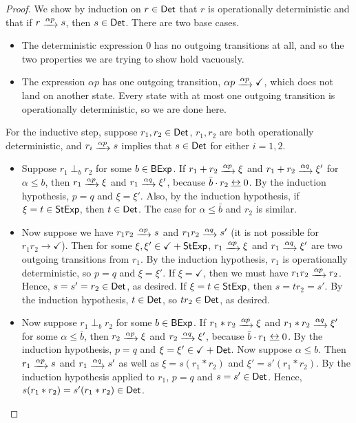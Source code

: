 \documentclass[orivec,envcountsect,envcountsame]{llncs}
\begin{document}
\begin{proof}
	We show by induction on \(r \in \mathsf{Det}\) that \(r\) is operationally deterministic and that if \(r \tr{\alpha p} s\), then \(s \in \mathsf{Det}\).
	There are two base cases.
	\begin{itemize}
		\item The deterministic expression \(0\) has no outgoing transitions at all, and so the two properties we are trying to show hold vacuously.
		\item The expression \(\alpha p\) has one outgoing transition, \(\alpha p \tr{\alpha p} \checkmark\), which does not land on another state.
		Every state with at most one outgoing transition is operationally deterministic, so we are done here.
	\end{itemize}
	For the inductive step, suppose \(r_1,r_2 \in \mathsf{Det}\), \(r_1,r_2\) are both operationally deterministic, and \(r_i \tr{\alpha p} s\) implies that \(s \in \mathsf{Det}\) for either \(i=1,2\).
	\begin{itemize}
		\item Suppose \(r_1 \perp_b r_2\) for some \(b \in \mathsf{BExp}\).
		If \(r_1 + r_2 \tr{\alpha p} \xi\) and \(r_1 + r_2 \tr{\alpha q} \xi'\) for \(\alpha \le b\), then \(r_1 \tr{\alpha p} \xi\) and \(r_1 \tr{\alpha q} \xi'\), because \(\bar b\cdot r_2 \bisim 0\).
		By the induction hypothesis, \(p = q\) and \(\xi = \xi'\).
		Also, by the induction hypothesis, if \(\xi = t \in \mathsf{StExp}\), then \(t \in \mathsf{Det}\).
		The case for \(\alpha \le \bar b\) and \(r_2\) is similar.

		\item Now suppose we have \(r_1r_2 \tr{\alpha p} s\) and \(r_1r_2 \tr{\alpha q} s'\) (it is not possible for \(r_1r_2 \to \checkmark\)).
		Then for some \(\xi,\xi' \in \checkmark + \mathsf{StExp}\), \(r_1 \tr{\alpha p} \xi\) and \(r_1 \tr{\alpha q} \xi'\) are two outgoing transitions from \(r_1\).
		By the induction hypothesis, \(r_1\) is operationally deterministic, so \(p = q\) and \(\xi = \xi'\).
		If \(\xi = \checkmark\), then we must have \(r_1r_2 \tr{\alpha p} r_2\).
		Hence, \(s = s' = r_2 \in \mathsf{Det}\), as desired.
		If \(\xi = t \in \mathsf{StExp}\), then \(s = tr_2 = s'\).
		By the induction hypothesis, \(t \in \mathsf{Det}\), so \(t r_2 \in \mathsf{Det}\), as desired.

		\item Now suppose \(r_1 \perp_b r_2\) for some \(b \in \mathsf{BExp}\).
		If \(r_1 * r_2 \tr{\alpha p} \xi\) and \(r_1 * r_2 \tr{\alpha q} \xi'\) for some \(\alpha \le \bar b\), then \(r_2 \tr{\alpha p} \xi\) and \(r_2 \tr{\alpha q} \xi'\), because \(\bar b \cdot r_1 \bisim 0\).
		By the induction hypothesis, \(p = q\) and \(\xi = \xi' \in \checkmark + \mathsf{Det}\).
		Now suppose \(\alpha \le b\).
		Then \(r_1 \tr{\alpha p} s\) and \(r_1 \tr{\alpha q} s'\) as well as \(\xi = s(r_1*r_2)\) and \(\xi' = s'(r_1*r_2)\).
		By the induction hypothesis applied to \(r_1\), \(p = q\) and \(s = s' \in \mathsf{Det}\).
		Hence, \(s(r_1*r_2) = s'(r_1*r_2) \in \mathsf{Det}\).
	\end{itemize}
\end{proof}
\end{document}
